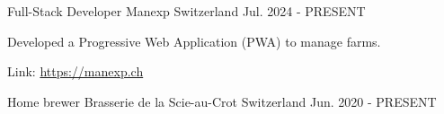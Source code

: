 

\begin{cventries}

    \cventry
    {Full-Stack Developer} %
    {Manexp} %
    {Switzerland} %
    {Jul. 2024 - PRESENT} %
    {
      \begin{cvitems} %
        \item {Developed a Progressive Web Application (PWA) to manage farms.}
        \item {Link: \href{https://manexp.ch}{https://manexp.ch}}
      \end{cvitems}
    }

    \cventry
    {Home brewer} %
    {Brasserie de la Scie-au-Crot} %
    {Switzerland} %
    {Jun. 2020 - PRESENT} %
    {}

\end{cventries}
